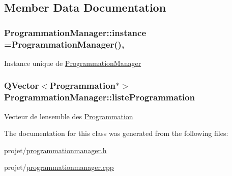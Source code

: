 \subsection{Member Data Documentation}
\hypertarget{class_programmation_manager_a04ca8715bceaec304a821a6d61b5a94d}{}
\subsubsection[{instance}]{ Programmation\+Manager\+::instance ={\bf Programmation\+Manager}()\hspace{0.3cm}{\ttfamily [static]}, {\ttfamily [private]}}\label{class_programmation_manager_a04ca8715bceaec304a821a6d61b5a94d}
Instance unique de \hyperlink{class_programmation_manager}{Programmation\+Manager} \hypertarget{class_programmation_manager_a23540a1467db12d716d19641d70447b8}{}
\subsubsection[{liste\+Programmation}]{\setlength{\rightskip}{0pt plus 5cm}Q\+Vector$<${\bf Programmation}$\ast$$>$ Programmation\+Manager\+::liste\+Programmation\hspace{0.3cm}{\ttfamily [private]}}\label{class_programmation_manager_a23540a1467db12d716d19641d70447b8}
Vecteur de l\textquotesingle{}ensemble des \hyperlink{class_programmation}{Programmation} 

The documentation for this class was generated from the following files\+:\begin{DoxyCompactItemize}
\item 
projet/\hyperlink{programmationmanager_8h}{programmationmanager.\+h}\item 
projet/\hyperlink{programmationmanager_8cpp}{programmationmanager.\+cpp}\end{DoxyCompactItemize}
